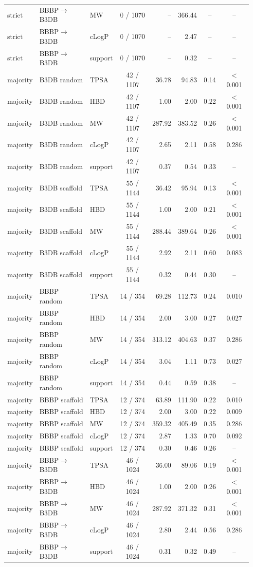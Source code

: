 \begin{tabular}{lllcrrcc}
strict & BBBP$\to$B3DB & MW & 0 / 1070 & -- & 366.44 & -- & --\\
strict & BBBP$\to$B3DB & cLogP & 0 / 1070 & -- & 2.47 & -- & --\\
strict & BBBP$\to$B3DB & support & 0 / 1070 & -- & 0.32 & -- & --\\
\midrule
majority & B3DB random & TPSA & 42 / 1107 & 36.78 & 94.83 & 0.14 & $<$0.001\\
majority & B3DB random & HBD & 42 / 1107 & 1.00 & 2.00 & 0.22 & $<$0.001\\
majority & B3DB random & MW & 42 / 1107 & 287.92 & 383.52 & 0.26 & $<$0.001\\
majority & B3DB random & cLogP & 42 / 1107 & 2.65 & 2.11 & 0.58 & 0.286\\
majority & B3DB random & support & 42 / 1107 & 0.37 & 0.54 & 0.33 & --\\
majority & B3DB scaffold & TPSA & 55 / 1144 & 36.42 & 95.94 & 0.13 & $<$0.001\\
majority & B3DB scaffold & HBD & 55 / 1144 & 1.00 & 2.00 & 0.21 & $<$0.001\\
majority & B3DB scaffold & MW & 55 / 1144 & 288.44 & 389.64 & 0.26 & $<$0.001\\
majority & B3DB scaffold & cLogP & 55 / 1144 & 2.92 & 2.11 & 0.60 & 0.083\\
majority & B3DB scaffold & support & 55 / 1144 & 0.32 & 0.44 & 0.30 & --\\
majority & BBBP random & TPSA & 14 / 354 & 69.28 & 112.73 & 0.24 & 0.010\\
majority & BBBP random & HBD & 14 / 354 & 2.00 & 3.00 & 0.27 & 0.027\\
majority & BBBP random & MW & 14 / 354 & 313.12 & 404.63 & 0.37 & 0.286\\
majority & BBBP random & cLogP & 14 / 354 & 3.04 & 1.11 & 0.73 & 0.027\\
majority & BBBP random & support & 14 / 354 & 0.44 & 0.59 & 0.38 & --\\
majority & BBBP scaffold & TPSA & 12 / 374 & 63.89 & 111.90 & 0.22 & 0.010\\
majority & BBBP scaffold & HBD & 12 / 374 & 2.00 & 3.00 & 0.22 & 0.009\\
majority & BBBP scaffold & MW & 12 / 374 & 359.32 & 405.49 & 0.35 & 0.286\\
majority & BBBP scaffold & cLogP & 12 / 374 & 2.87 & 1.33 & 0.70 & 0.092\\
majority & BBBP scaffold & support & 12 / 374 & 0.30 & 0.46 & 0.26 & --\\
majority & BBBP$\to$B3DB & TPSA & 46 / 1024 & 36.00 & 89.06 & 0.19 & $<$0.001\\
majority & BBBP$\to$B3DB & HBD & 46 / 1024 & 1.00 & 2.00 & 0.26 & $<$0.001\\
majority & BBBP$\to$B3DB & MW & 46 / 1024 & 287.92 & 371.32 & 0.31 & $<$0.001\\
majority & BBBP$\to$B3DB & cLogP & 46 / 1024 & 2.80 & 2.44 & 0.56 & 0.286\\
majority & BBBP$\to$B3DB & support & 46 / 1024 & 0.31 & 0.32 & 0.49 & --\\
\bottomrule
\end{tabular}
